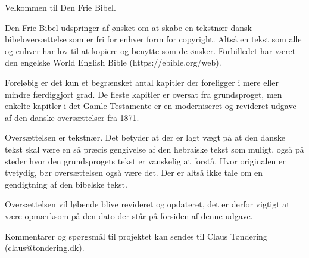 
Velkommen til Den Frie Bibel.

Den Frie Bibel udspringer af ønsket om at skabe en tekstnær dansk bibeloversættelse som er fri for
enhver form for copyright. Altså en tekst som alle og enhver har lov til at kopiere og benytte som
de ønsker. Forbilledet har været den engelske World English Bible (https://ebible.org/web).

Foreløbig er det kun et begrænsket antal kapitler der foreligger i mere eller mindre færdiggjort
grad. De fleste kapitler er oversat fra grundsproget, men enkelte kapitler i det Gamle Testamente er
en moderniseret og revideret udgave af den danske oversættelser fra 1871.

Oversættelsen er tekstnær. Det betyder at der er lagt vægt på at den danske tekst skal være en så
præcis gengivelse af den hebraiske tekst som muligt, også på steder hvor den grundsprogets tekst er
vanskelig at forstå. Hvor originalen er tvetydig, bør oversættelsen også være det. Der er altså ikke
tale om en gendigtning af den bibelske tekst.

Oversættelsen vil løbende blive revideret og opdateret, det er derfor vigtigt at være opmærksom på
den dato der står på forsiden af denne udgave.

Kommentarer og spørgsmål til projektet kan sendes til Claus Tøndering (claus@tondering.dk).
